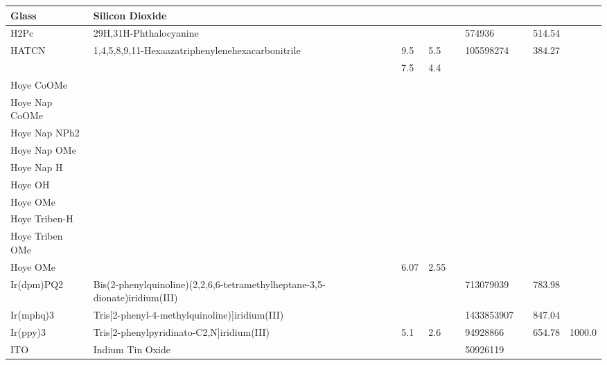 \documentclass{article}
\begin{document}
\begin{landscape}
\begin{longtable}{| p{} | p{} | p{} | p{} | p{} | p{} | p{} | p{} | p{} | p{} | }
 \hline 
Glass & Silicon Dioxide &  &  &  &  &  &  &  &  \\ 
 
 \hline 
H2Pc & 29H,31H-Phthalocyanine &  &  &  &  & 574936 &  & 514.54 &  \\ 
 
 \hline 
HATCN & 1,4,5,8,9,11-Hexaazatriphenylenehexacarbonitrile &  & 9.5 & 5.5 &  & 105598274 &  & 384.27 &  \\ 
 & &  & 7.5 & 4.4 &  &  & & & \\ 
 
 \hline 
Hoye CoOMe &  &  &  &  &  &  &  &  &  \\ 
 
 \hline 
Hoye Nap CoOMe &  &  &  &  &  &  &  &  &  \\ 
 
 \hline 
Hoye Nap NPh2 &  &  &  &  &  &  &  &  &  \\ 
 
 \hline 
Hoye Nap OMe &  &  &  &  &  &  &  &  &  \\ 
 
 \hline 
Hoye Nap H &  &  &  &  &  &  &  &  &  \\ 
 
 \hline 
Hoye OH &  &  &  &  &  &  &  &  &  \\ 
 
 \hline 
Hoye OMe &  &  &  &  &  &  &  &  &  \\ 
 
 \hline 
Hoye Triben-H &  &  &  &  &  &  &  &  &  \\ 
 
 \hline 
Hoye Triben OMe &  &  &  &  &  &  &  &  &  \\ 
 
 \hline 
Hoye OMe &  &  & 6.07 & 2.55 &  &  &  &  &  \\ 
 
 \hline 
Ir(dpm)PQ2 & Bis(2-phenylquinoline)(2,2,6,6-tetramethylheptane-3,5-dionate)iridium(III) &  &  &  &  & 713079039 &  & 783.98 &  \\ 
 
 \hline 
Ir(mphq)3 & Tris[2-phenyl-4-methylquinoline)]iridium(III) &  &  &  &  & 1433853907 &  & 847.04 &  \\ 
 
 \hline 
Ir(ppy)3 & Tris[2-phenylpyridinato-C2,N]iridium(III) &  & 5.1 & 2.6 &  & 94928866 &  & 654.78 & 1000.0 \\ 
 
 \hline 
ITO & Indium Tin Oxide &  &  &  &  & 50926119 &  &  &  \\ 
 

\end{longtable}
\end{landscape}
\end{document}
